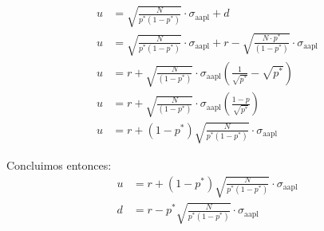 \documentclass{article}
\theoremstyle{remark}
\theoremstyle{definition}
\begin{document}
    \begin{align*}
        u &= \sqrt{\frac{N}{p^{*}\left(1-p^{*}\right)}}\cdot\sigma_{\text{aapl}} + d\\
        u &= \sqrt{\frac{N}{p^{*}\left(1-p^{*}\right)}}\cdot\sigma_{\text{aapl}} + r- \sqrt{\frac{N \cdot p^{*}}{\left(1-p^{*}\right)}}\cdot\sigma_{\text{aapl}}\\
        u &= r + \sqrt{\frac{N}{\left(1-p^{*}\right)}}\cdot\sigma_{\text{aapl}}\left(\frac{1}{\sqrt{p^{*}}} -\sqrt{p^{*}}\right)\\
        u &= r + \sqrt{\frac{N}{\left(1-p^{*}\right)}}\cdot\sigma_{\text{aapl}}\left(\frac{1-p}{\sqrt{p^{*}}}\right) \\
        u &= r + \left({1-p^{*}}\right)\sqrt{\frac{N}{p^{*}\left(1-p^{*}\right)}}\cdot\sigma_{\text{aapl}}
    \end{align*}

    Concluimos entonces:
    \begin{align}
        u &= r + \left({1-p^{*}}\right)\sqrt{\frac{N}{p^{*}\left(1-p^{*}\right)}}\cdot\sigma_{\text{aapl}} \\
        d &=r- p^{*}\sqrt{\frac{N}{p^{*}\left(1-p^{*}\right)}}\cdot\sigma_{\text{aapl}}
    \end{align}
    
    
\end{document}
